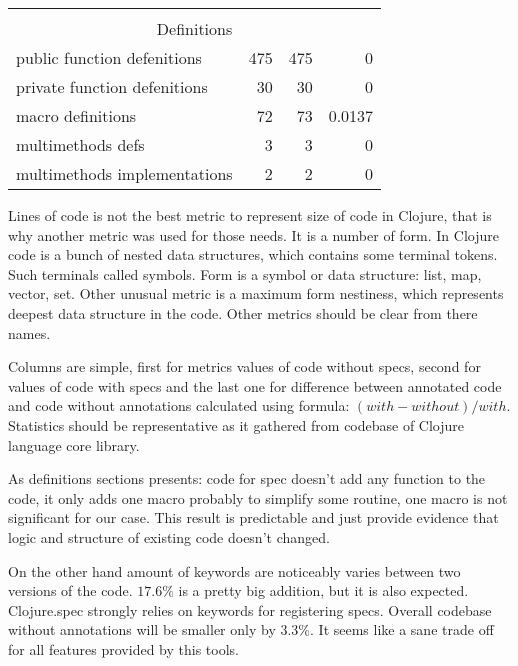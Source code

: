 \begin{table}[]
\begin{tabular}{lrrr}
                                                   & \multicolumn{1}{l}{}         & \multicolumn{1}{l}{}       & \multicolumn{1}{l}{}          \\
\multicolumn{4}{c}{Definitions}                                                                                                                \\ \hline
\multicolumn{1}{|l|}{public function defenitions}  & \multicolumn{1}{r|}{475}     & \multicolumn{1}{r|}{475}   & \multicolumn{1}{r|}{0}        \\ \hline
\multicolumn{1}{|l|}{private function defenitions} & \multicolumn{1}{r|}{30}      & \multicolumn{1}{r|}{30}    & \multicolumn{1}{r|}{0}        \\ \hline
\multicolumn{1}{|l|}{macro definitions}            & \multicolumn{1}{r|}{72}      & \multicolumn{1}{r|}{73}    & \multicolumn{1}{r|}{0.0137}   \\ \hline
\multicolumn{1}{|l|}{multimethods defs}            & \multicolumn{1}{r|}{3}       & \multicolumn{1}{r|}{3}     & \multicolumn{1}{r|}{0}        \\ \hline
\multicolumn{1}{|l|}{multimethods implementations} & \multicolumn{1}{r|}{2}       & \multicolumn{1}{r|}{2}     & \multicolumn{1}{r|}{0}        \\ \hline
\end{tabular}
\end{table}

Lines of code is not the best metric to represent size of code in Clojure,
that is why another metric was used for those needs. It is a number of form. In
Clojure code is a bunch of nested data structures, which contains some terminal
tokens. Such terminals called symbols. Form is a symbol or data structure: list,
map, vector, set. Other unusual metric is a maximum form nestiness, which
represents deepest data structure in the code. Other metrics should be clear
from there names.

Columns are simple, first for metrics values of code without specs, second for
values of code with specs and the last one for difference between annotated code
and code without annotations calculated using formula: $(with - without)/with$.
Statistics should be representative as it gathered from codebase of Clojure
language core library.

As definitions sections presents: code for spec doesn't add any function to the
code, it only adds one macro probably to simplify some routine, one macro is not
significant for our case. This result is predictable and just provide evidence
that logic and structure of existing code doesn't changed.

On the other hand amount of keywords are noticeably varies between two versions
of the code. $17.6\%$ is a pretty big addition, but it is also expected.
Clojure.spec strongly relies on keywords for registering specs. Overall codebase
without annotations will be smaller only by $3.3\%$. It seems like a sane trade
off for all features provided by this tools.
